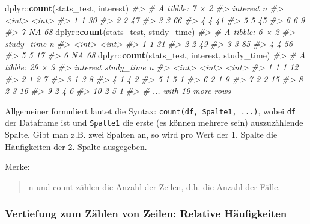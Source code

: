 \documentclass[12pt,ngerman,]{book}
\makeatletter
\newenvironment{Shaded}{\begin{snugshade}}{\end{snugshade}}
\newcommand{\KeywordTok}[1]{\textcolor[rgb]{0.13,0.29,0.53}{\textbf{{#1}}}}
\newcommand{\CommentTok}[1]{\textcolor[rgb]{0.56,0.35,0.01}{\textit{{#1}}}}
\newcommand{\NormalTok}[1]{{#1}}
\newenvironment{kframe}{%
\medskip{}
\setlength{\fboxsep}{.8em}
 \def\at@end@of@kframe{}%
 \ifinner\ifhmode%
  \def\at@end@of@kframe{\end{minipage}}%
  \begin{minipage}{\columnwidth}%
 \fi\fi%
 \def\FrameCommand##1{\hskip\@totalleftmargin \hskip-\fboxsep
 \colorbox{shadecolor}{##1}\hskip-\fboxsep
     \hskip-\linewidth \hskip-\@totalleftmargin \hskip\columnwidth}%
 \MakeFramed {\advance\hsize-\width
   \@totalleftmargin\z@ \linewidth\hsize
   \@setminipage}}%
 {\par\unskip\endMakeFramed%
 \at@end@of@kframe}
\renewenvironment{Shaded}{\begin{kframe}}{\end{kframe}}
\makeatother
\begin{document}
\begin{Shaded}
\begin{Highlighting}[]
\NormalTok{dplyr::}\KeywordTok{count}\NormalTok{(stats_test, interest)}
\CommentTok{#> # A tibble: 7 × 2}
\CommentTok{#>   interest     n}
\CommentTok{#>      <int> <int>}
\CommentTok{#> 1        1    30}
\CommentTok{#> 2        2    47}
\CommentTok{#> 3        3    66}
\CommentTok{#> 4        4    41}
\CommentTok{#> 5        5    45}
\CommentTok{#> 6        6     9}
\CommentTok{#> 7       NA    68}
\NormalTok{dplyr::}\KeywordTok{count}\NormalTok{(stats_test, study_time)}
\CommentTok{#> # A tibble: 6 × 2}
\CommentTok{#>   study_time     n}
\CommentTok{#>        <int> <int>}
\CommentTok{#> 1          1    31}
\CommentTok{#> 2          2    49}
\CommentTok{#> 3          3    85}
\CommentTok{#> 4          4    56}
\CommentTok{#> 5          5    17}
\CommentTok{#> 6         NA    68}
\NormalTok{dplyr::}\KeywordTok{count}\NormalTok{(stats_test, interest, study_time)}
\CommentTok{#> # A tibble: 29 × 3}
\CommentTok{#>    interest study_time     n}
\CommentTok{#>       <int>      <int> <int>}
\CommentTok{#> 1         1          1    12}
\CommentTok{#> 2         1          2     7}
\CommentTok{#> 3         1          3     8}
\CommentTok{#> 4         1          4     2}
\CommentTok{#> 5         1          5     1}
\CommentTok{#> 6         2          1     9}
\CommentTok{#> 7         2          2    15}
\CommentTok{#> 8         2          3    16}
\CommentTok{#> 9         2          4     6}
\CommentTok{#> 10        2          5     1}
\CommentTok{#> # ... with 19 more rows}
\end{Highlighting}
\end{Shaded}

Allgemeiner formuliert lautet die Syntax:
\texttt{count(df,\ Spalte1,\ ...)}, wobei \texttt{df} der Dataframe ist
und \texttt{Spalte1} die erste (es können mehrere sein) auszuzählende
Spalte. Gibt man z.B. zwei Spalten an, so wird pro Wert der 1. Spalte
die Häufigkeiten der 2. Spalte ausgegeben.

Merke:

\begin{quote}
n und count zählen die Anzahl der Zeilen, d.h. die Anzahl der Fälle.
\end{quote}

\subsubsection{Vertiefung zum Zählen von Zeilen: Relative
Häufigkeiten}\label{vertiefung-zum-zahlen-von-zeilen-relative-haufigkeiten}
\end{document}
